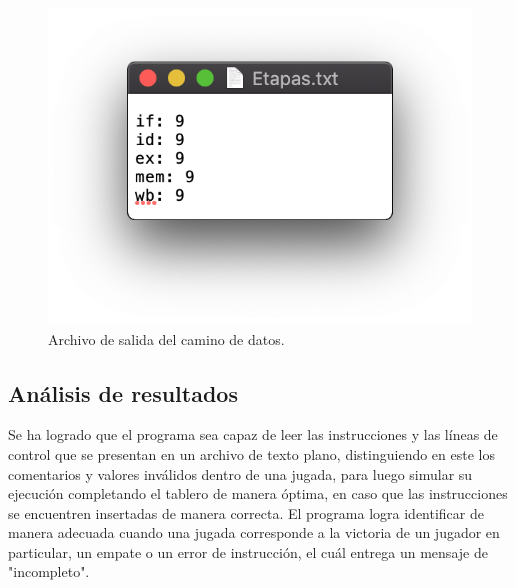 \begin{figure}[H]
	\centering
	\includegraphics[scale=0.5]{images/Etapas.png}
	\caption{Archivo de salida del camino de datos.}
	\label{fig:ej3}
\end{figure}


\subsection{Análisis de resultados}

\noindent Se ha logrado que el programa sea capaz de leer las instrucciones y las líneas de control que se presentan en un archivo de texto plano, distinguiendo en este los comentarios y valores inválidos dentro de una jugada, para luego simular su ejecución completando el tablero de manera óptima, en caso que las instrucciones se encuentren insertadas de manera correcta. El programa logra identificar de manera adecuada cuando una jugada corresponde a la victoria de un jugador en particular, un empate o un error de instrucción, el cuál entrega un mensaje de "incompleto".
